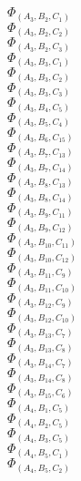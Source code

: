 \documentclass[14pt]{article}
\begin{document}
    $\Phi_{({A}_{3}, {B}_{2}, {C}_{1})}$ \\ 
    $\Phi_{({A}_{3}, {B}_{2}, {C}_{2})}$ \\ 
    $\Phi_{({A}_{3}, {B}_{2}, {C}_{3})}$ \\ 
    $\Phi_{({A}_{3}, {B}_{3}, {C}_{1})}$ \\ 
    $\Phi_{({A}_{3}, {B}_{3}, {C}_{2})}$ \\ 
    $\Phi_{({A}_{3}, {B}_{3}, {C}_{3})}$ \\ 
    $\Phi_{({A}_{3}, {B}_{4}, {C}_{5})}$ \\ 
    $\Phi_{({A}_{3}, {B}_{5}, {C}_{4})}$ \\ 
    $\Phi_{({A}_{3}, {B}_{6}, {C}_{15})}$ \\ 
    $\Phi_{({A}_{3}, {B}_{7}, {C}_{13})}$ \\ 
    $\Phi_{({A}_{3}, {B}_{7}, {C}_{14})}$ \\ 
    $\Phi_{({A}_{3}, {B}_{8}, {C}_{13})}$ \\ 
    $\Phi_{({A}_{3}, {B}_{8}, {C}_{14})}$ \\ 
    $\Phi_{({A}_{3}, {B}_{9}, {C}_{11})}$ \\ 
    $\Phi_{({A}_{3}, {B}_{9}, {C}_{12})}$ \\ 
    $\Phi_{({A}_{3}, {B}_{10}, {C}_{11})}$ \\ 
    $\Phi_{({A}_{3}, {B}_{10}, {C}_{12})}$ \\ 
    $\Phi_{({A}_{3}, {B}_{11}, {C}_{9})}$ \\ 
    $\Phi_{({A}_{3}, {B}_{11}, {C}_{10})}$ \\ 
    $\Phi_{({A}_{3}, {B}_{12}, {C}_{9})}$ \\ 
    $\Phi_{({A}_{3}, {B}_{12}, {C}_{10})}$ \\ 
    $\Phi_{({A}_{3}, {B}_{13}, {C}_{7})}$ \\ 
    $\Phi_{({A}_{3}, {B}_{13}, {C}_{8})}$ \\ 
    $\Phi_{({A}_{3}, {B}_{14}, {C}_{7})}$ \\ 
    $\Phi_{({A}_{3}, {B}_{14}, {C}_{8})}$ \\ 
    $\Phi_{({A}_{3}, {B}_{15}, {C}_{6})}$ \\ 
    $\Phi_{({A}_{4}, {B}_{1}, {C}_{5})}$ \\ 
    $\Phi_{({A}_{4}, {B}_{2}, {C}_{5})}$ \\ 
    $\Phi_{({A}_{4}, {B}_{3}, {C}_{5})}$ \\ 
    $\Phi_{({A}_{4}, {B}_{5}, {C}_{1})}$ \\ 
    $\Phi_{({A}_{4}, {B}_{5}, {C}_{2})}$ \\ 
\end{document}
